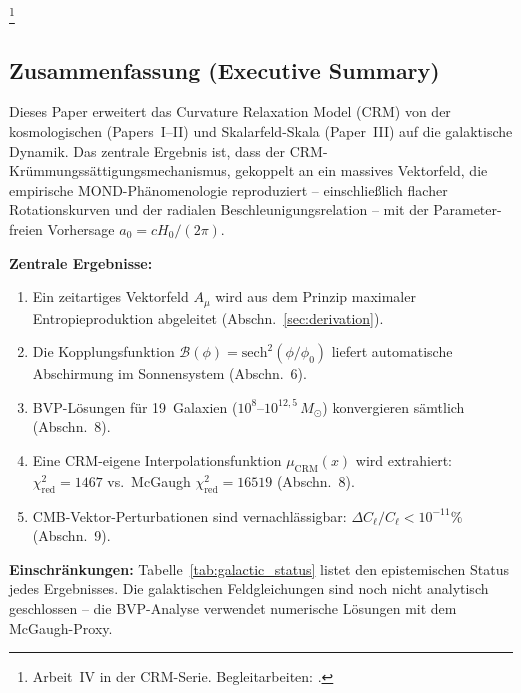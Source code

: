 \documentclass[aps,prd,twocolumn,superscriptaddress,nofootinbib]{revtex4-2}
\begin{document}
\thanks{Arbeit~IV in der CRM-Serie. Begleitarbeiten: \cite{Geiger2026,Geiger2026b,Geiger2026c}.}

\maketitle

\subsection*{Zusammenfassung (Executive Summary)}

Dieses Paper erweitert das Curvature Relaxation Model (CRM) von der kosmologischen (Papers~I--II) und Skalarfeld-Skala (Paper~III) auf die galaktische Dynamik. Das zentrale Ergebnis ist, dass der CRM-Kr\"ummungss\"attigungsmechanismus, gekoppelt an ein massives Vektorfeld, die empirische MOND-Ph\"anomenologie reproduziert -- einschlie\ss{}lich flacher Rotationskurven und der radialen Beschleunigungsrelation -- mit der Parameter-freien Vorhersage $a_0 = cH_0/(2\pi)$.

\textbf{Zentrale Ergebnisse:}
\begin{enumerate}
\item Ein zeitartiges Vektorfeld $A_\mu$ wird aus dem Prinzip maximaler Entropieproduktion abgeleitet (Abschn.~\ref{sec:derivation}).
\item Die Kopplungsfunktion $\mathcal{B}(\phi) = \mathrm{sech}^2(\phi/\phi_0)$ liefert automatische Abschirmung im Sonnensystem (Abschn.~6).
\item BVP-L\"osungen f\"ur 19~Galaxien ($10^8$--$10^{12{,}5}\,M_\odot$) konvergieren s\"amtlich (Abschn.~8).
\item Eine CRM-eigene Interpolationsfunktion $\mu_{\mathrm{CRM}}(x)$ wird extrahiert: $\chi^2_{\mathrm{red}} = 1467$ vs.\ McGaugh $\chi^2_{\mathrm{red}} = 16519$ (Abschn.~8).
\item CMB-Vektor-Perturbationen sind vernachl\"assigbar: $\Delta C_\ell/C_\ell < 10^{-11}\%$ (Abschn.~9).
\end{enumerate}

\textbf{Einschr\"ankungen:} Tabelle~\ref{tab:galactic_status} listet den epistemischen Status jedes Ergebnisses. Die galaktischen Feldgleichungen sind noch nicht analytisch geschlossen -- die BVP-Analyse verwendet numerische L\"osungen mit dem McGaugh-Proxy.


\end{document}
